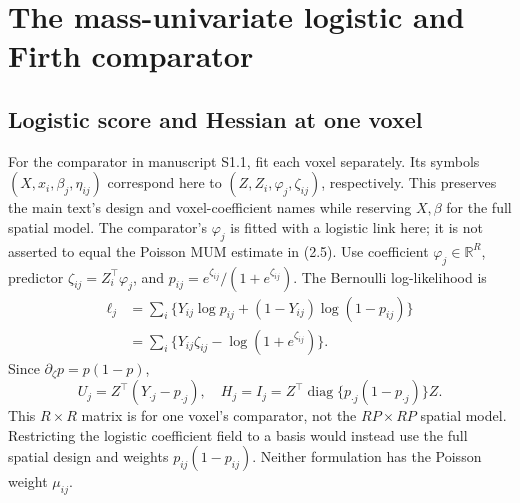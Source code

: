 \documentclass[11pt,a4paper]{article}
\newcommand{\R}{\mathbb R}
\newcommand{\diag}{\operatorname{diag}}
\numberwithin{equation}{section}
\begin{document}
\section{The mass-univariate logistic and Firth comparator}
\label{lesion-logistic}

\subsection{Logistic score and Hessian at one voxel}
For the comparator in manuscript S1.1, fit each voxel separately.
Its symbols $(X,x_i,\beta_j,\eta_{ij})$ correspond here to
$(Z,Z_i,\varphi_j,\zeta_{ij})$, respectively.
This preserves the main text's design and voxel-coefficient names
while reserving $X,\beta$ for the full spatial model.
The comparator's $\varphi_j$ is fitted with a logistic link here;
it is not asserted to equal the Poisson MUM estimate in (2.5).
Use coefficient $\varphi_j\in\R^R$, predictor
$\zeta_{ij}=Z_i^\top\varphi_j$, and
$p_{ij}=e^{\zeta_{ij}}/(1+e^{\zeta_{ij}})$.
The Bernoulli log-likelihood is
\begin{align}
 \ell_j
 &=\sum_i\{Y_{ij}\log p_{ij}+(1-Y_{ij})\log(1-p_{ij})\}\\
 &=\sum_i\{Y_{ij}\zeta_{ij}-\log(1+e^{\zeta_{ij}})\}.
\end{align}
Since $\partial_\zeta p=p(1-p)$,
\[
 U_j=Z^\top(Y_{\cdot j}-p_{\cdot j}),\quad
 H_j=I_j=Z^\top\diag\{p_{\cdot j}(1-p_{\cdot j})\}Z.
\]
This $R\times R$ matrix is for one voxel's comparator, not the
$RP\times RP$ spatial model. Restricting the logistic coefficient
field to a basis would instead use the full spatial design and
weights $p_{ij}(1-p_{ij})$.
Neither formulation has the Poisson weight $\mu_{ij}$.
\end{document}
